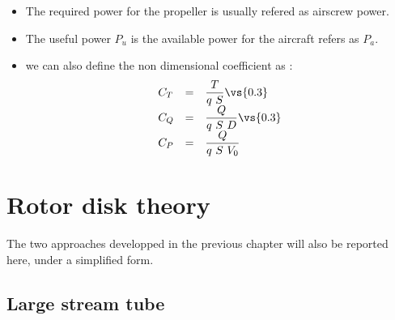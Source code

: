 
\begin{itemize}
  \item The required power for the propeller is usually refered as airscrew power. 
  \item The useful power $P_u$ is the available power for the aircraft refers as $P_a$.
  \item we can also define the non dimensional coefficient as : 
  $$ \begin{array}{lcl}
    C_T &=& \dfrac{T}{q~S}  \vs{0.3}\\
    C_Q &=& \dfrac{Q}{q~S~D} \vs{0.3}\\
    C_P &=& \dfrac{Q}{q~S~V_0}
  \end{array}$$ 
\end{itemize}
\section{Rotor disk theory}

The two approaches developped in the previous chapter  will also be reported here, 
under a simplified form.



\subsection{Large stream tube}

